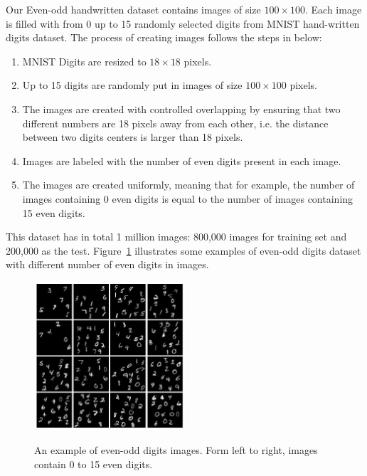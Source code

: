 Our Even-odd handwritten dataset contains images of size $100\times100$. Each image is filled with from 0 up to 15 randomly selected digits from MNIST hand-written digits dataset. The process of creating images follows the steps in below:
\begin{enumerate}
\item MNIST Digits are resized to $18\times18$ pixels.
\item Up to 15 digits are randomly put in images of size $100\times100$ pixels.
\item The images are created with controlled overlapping by ensuring that two different numbers are 18 pixels away from each other, i.e. the distance between two digits centers is larger than 18 pixels.
\item Images are labeled with the number of even digits present in each image. 
\item The images are created uniformly, meaning that for example, the number of images containing 0 even digits is equal to the number of images containing 15 even digits.
\end{enumerate}
 This dataset has in total 1 million images: 800,000 images for training set and 200,000 as the test. Figure~\ref{fig:l2cmnist} illustrates some examples of even-odd digits dataset with different number of even digits in images.

\begin{figure}[H]
	\centering
	{\includegraphics[width=0.5\textwidth]{images/l2cimages}}
		\caption{An example of even-odd digits images. Form left to right, images contain 0 to 15 even digits.}
	\label{fig:l2cmnist}
\end{figure}


